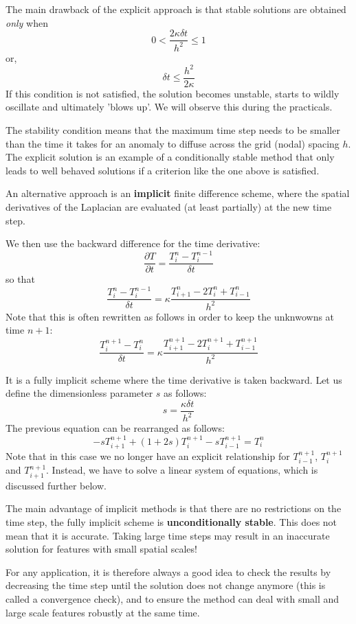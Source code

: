 The main drawback of the explicit approach is that stable solutions are
obtained {\it only} when
\[
0 < \frac{2\kappa \delta t}{h^2} \leq1
\]
or,
\[
\delta t \leq \frac{h^2}{2 \kappa}
\]
If this condition is not satisfied, the solution becomes {\color{olive} unstable}, starts to
wildly oscillate and ultimately 'blows up'. We will observe this during the practicals. 

The stability condition means that the maximum time step needs to be smaller than the time it
takes for an anomaly to diffuse across the grid (nodal) spacing $h$.
The explicit solution is an example of a {\color{olive} conditionally stable method}
that only leads to well behaved solutions if a criterion like the one above is satisfied.

An alternative approach is an {\bf implicit} finite difference scheme, where the spatial derivatives
of the Laplacian are evaluated (at least partially) at the new time step.

We then use the backward difference for the time derivative:
\[
\frac{\partial T}{\partial t} 
= \frac{T_{i}^{n}-T_i^{n-1}}{\delta t} 
\]
so that
\[
\frac{T_{i}^{n}-T_i^{n-1}}{\delta t} 
= \kappa \frac{T_{i+1}^n - 2T_i^n + T_{i-1}^n}{h^2}
\]
Note that this is often rewritten as follows in order to keep the unknwowns at time $n+1$:
\[
\frac{T_{i}^{n+1}-T_i^{n}}{\delta t} 
= \kappa \frac{T_{i+1}^{n+1} - 2T_i^{n+1} + T_{i-1}^{n+1}}{h^2}
\]

It is a fully implicit scheme where the time derivative is taken backward.
Let us define the dimensionless parameter $s$ as follows:
\[
s=\frac{\kappa \delta t}{h^2}
\]
The previous equation can be rearranged as follows:
\[
\boxed{
-s T_{i+1}^{n+1} + (1+2s) T_{i}^{n+1} - s T_{i-1}^{n+1} = T_i^{n}
}
\]
Note that in this case we no longer have an explicit relationship for 
$T^{n+1}_{i-1}$, $T^{n+1}_i$ and $T^{n+1}_{i+1}$.
Instead, we have to solve a {\color{olive}linear system of equations}, which is discussed further below.

The main advantage of implicit methods is that there are no restrictions on the time step,
the fully implicit scheme is {\bf unconditionally stable}.
This does not mean that it is accurate. 
Taking large time steps may result in an inaccurate solution for features with
small spatial scales!

For any application, it is therefore always a good idea to check the 
results by decreasing the time step
until the solution does not change anymore (this is called a {\color{olive}convergence check}), and 
to ensure the
method can deal with small and large scale features robustly at the same time.

